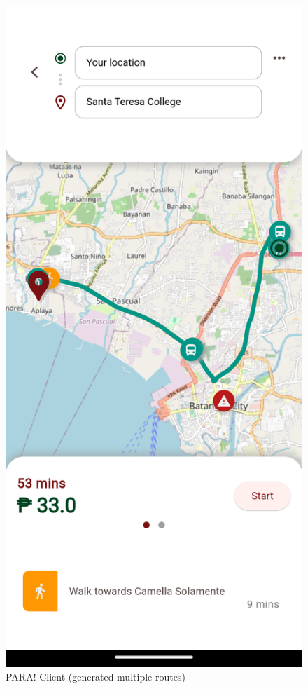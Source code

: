 \documentclass{icsthesis}
\begin{document}
\begin{mainmatter}
\begin{description}
		\begin{figure}[h]
			\centering
				\includegraphics[scale=0.1]{./figures/client/multiple route.png}
			\caption{PARA! Client (generated multiple routes)}
		\end{figure}
		

\end{description}
\end{mainmatter}
\end{document}
